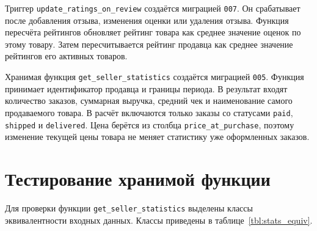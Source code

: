 Триггер \texttt{update\_ratings\_on\_review} создаётся миграцией \texttt{007}. Он срабатывает после добавления отзыва, изменения оценки или удаления отзыва. Функция пересчёта рейтингов обновляет рейтинг товара как среднее значение оценок по этому товару. Затем пересчитывается рейтинг продавца как среднее значение рейтингов его активных товаров.

Хранимая функция \texttt{get\_seller\_statistics} создаётся миграцией \texttt{005}. Функция принимает идентификатор продавца и границы периода. В результат входят количество заказов, суммарная выручка, средний чек и наименование самого продаваемого товара. В расчёт включаются только заказы со статусами \texttt{paid}, \texttt{shipped} и \texttt{delivered}. Цена берётся из столбца \texttt{price\_at\_purchase}, поэтому изменение текущей цены товара не меняет статистику уже оформленных заказов.

\section{Тестирование хранимой функции}

Для проверки функции \texttt{get\_seller\_statistics} выделены классы эквивалентности входных данных. Классы приведены в таблице~\ref{tbl:stats_equiv}.

